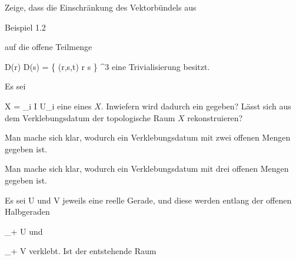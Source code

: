 {}
{





Zeige, dass die Einschränkung des Vektorbündels aus

Beispiel 1.2

auf die offene Teilmenge

\mavergleichskettedisp
{\vergleichskette
{D(r) \cup D(s)
}
{ =} { \left\{ (r,s,t)  \mid  r   s         \right\}
}
{ \subset} {\R^3
}
{ } {
}
{ } {
}
}
{}{}{}
eine Trivialisierung besitzt.





}
{} {}

{}
{





Es sei

\mavergleichskette
{\vergleichskette
{X
}
{ = }{ \bigcup_{i \in I} U_i
}
{  }{
}
{    }{
}
{   }{
}
}
{}{}{}
eine
eines
$X$. Inwiefern wird dadurch ein
gegeben? Lässt sich aus dem Verklebungsdatum der topologische Raum $X$ rekonstruieren?





}
{} {}

{}
{





Man mache sich klar, wodurch ein Verklebungsdatum mit zwei offenen Mengen gegeben ist.





}
{} {}

{}
{





Man mache sich klar, wodurch ein Verklebungsdatum mit drei offenen Mengen gegeben ist.





}
{} {}

{}
{





Es sei
\mathkor {} {U} {und} {V} {}
jeweils eine reelle Gerade, und diese werden entlang der offenen Halbgeraden

\mavergleichskette
{\vergleichskette
{\R_+
}
{ \subseteq }{ U
}
{  }{
}
{    }{
}
{   }{
}
}
{}{}{}
und

\mavergleichskette
{\vergleichskette
{\R_+
}
{ \subseteq }{ V
}
{  }{
}
{    }{
}
{   }{
}
}
{}{}{}
verklebt. Ist der entstehende Raum





}
{} {}

